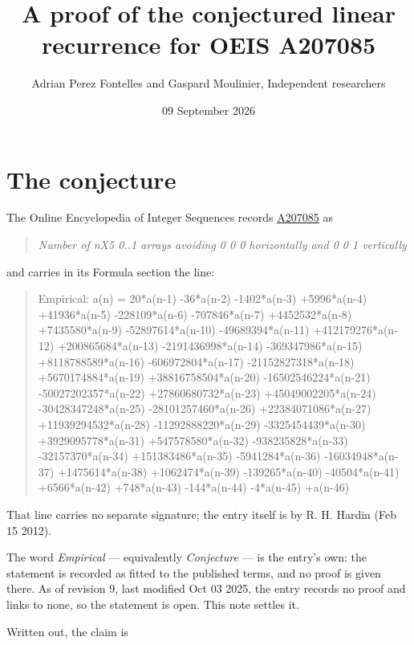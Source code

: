 \documentclass[11pt]{article}
\title{A proof of the conjectured linear recurrence for OEIS A207085}
\author{Adrian Perez Fontelles and Gaspard Moulinier, Independent researchers}
\date{09 September 2026}
\theoremstyle{definition}
\begin{document}
\maketitle
\section{The conjecture}

The Online Encyclopedia of Integer Sequences records \href{https://oeis.org/A207085}{A207085} as

\begin{quote}\itshape Number of nX5 0..1 arrays avoiding 0 0 0 horizontally and 0 0 1 vertically\end{quote}

and carries in its Formula section the line:

\begin{quote}\ttfamily Empirical: a(n) = 20*a(n-1) -36*a(n-2) -1402*a(n-3) +5996*a(n-4) +41936*a(n-5) -228109*a(n-6) -707846*a(n-7) +4452532*a(n-8) +7435580*a(n-9) -52897614*a(n-10) -49689394*a(n-11) +412179276*a(n-12) +200865684*a(n-13) -2191436998*a(n-14) -369347986*a(n-15) +8118788589*a(n-16) -606972804*a(n-17) -21152827318*a(n-18) +5670174884*a(n-19) +38816758504*a(n-20) -16502546224*a(n-21) -50027202357*a(n-22) +27860680732*a(n-23) +45049002205*a(n-24) -30428347248*a(n-25) -28101257460*a(n-26) +22384071086*a(n-27) +11939294532*a(n-28) -11292888220*a(n-29) -3325454439*a(n-30) +3929095778*a(n-31) +547578580*a(n-32) -938235828*a(n-33) -32157370*a(n-34) +151383486*a(n-35) -5941284*a(n-36) -16034948*a(n-37) +1475614*a(n-38) +1062474*a(n-39) -139265*a(n-40) -40504*a(n-41) +6566*a(n-42) +748*a(n-43) -144*a(n-44) -4*a(n-45) +a(n-46)\end{quote}

That line carries no separate signature; the entry itself is by R. H. Hardin (Feb 15 2012).

The word {\itshape Empirical} --- equivalently {\itshape Conjecture} --- is the entry's own: the statement is recorded as fitted to the published terms, and no proof is given there. As of revision 9, last modified Oct 03 2025, the entry records no proof and links to none, so the statement is open. This note settles it.

Written out, the claim is
\end{document}

